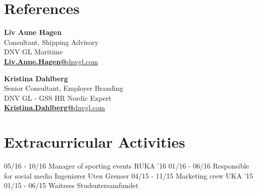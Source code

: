 \documentclass[]{friggeri-cv}
\begin{document}
\section{References}
\begin{minipage}{.45\linewidth}
\begin{flushleft}                           
\textbf{Liv Aune Hagen}\\
Consultant, Shipping Advisory \\
DNV GL Maritime\\
\href{mailto:Liv.Aune.Hagen@dnvgl.com}{\textbf{Liv.Aune.Hagen@}dnvgl.com}
\vspace{2mm}
\end{flushleft} 
\end{minipage}
\hfill
\begin{minipage}{.45\linewidth}
\begin{flushright}                                  \textbf{Kristina Dahlberg} \\
Senior Consultant, Employer Branding \\
DNV GL - GSS HR Nordic Expert \\
\href{mailto:Kristina.Dahlberg@dnvgl.com}{\textbf{Kristina.Dahlberg@}dnvgl.com}
\end{flushright} 
\end{minipage}


\section{Extracurricular Activities}
\begin{entrylist}
   \entry
    {05/16 - 10/16}
    {Manager of sporting events}
    {RUKA '16}
    {}
  \entry
    {01/16 - 06/16}
    {Responsible for social media}
    {Ingeniører Uten Grenser}
    {}
  \entry
    {04/15 - 11/15}
    {Marketing crew}
    {UKA '15}
    {}
  \entry
    {01/15 - 06/15}
    {Waitress}
    {Studentersamfundet}
    {}
\end{entrylist}
\end{document}
